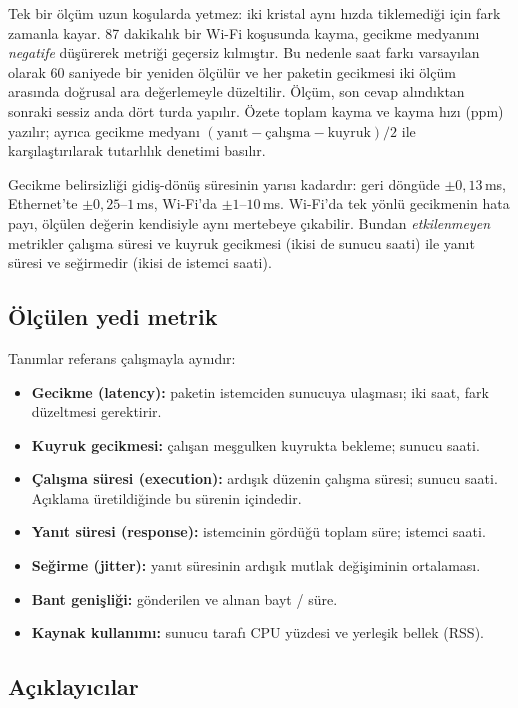 \documentclass[conference]{IEEEtran}
\newcommand{\ms}{\,ms\xspace}
\begin{document}
Tek bir ölçüm uzun koşularda yetmez: iki kristal aynı hızda tiklemediği için
fark zamanla kayar. 87 dakikalık bir Wi-Fi koşusunda kayma, gecikme medyanını
\emph{negatife} düşürerek metriği geçersiz kılmıştır. Bu nedenle saat farkı
varsayılan olarak 60 saniyede bir yeniden ölçülür ve her paketin gecikmesi iki
ölçüm arasında doğrusal ara değerlemeyle düzeltilir. Ölçüm, son cevap alındıktan
sonraki sessiz anda dört turda yapılır. Özete toplam kayma ve kayma hızı (ppm)
yazılır; ayrıca gecikme medyanı
$(\text{yanıt} - \text{çalışma} - \text{kuyruk})/2$ ile karşılaştırılarak
tutarlılık denetimi basılır.

Gecikme belirsizliği gidiş-dönüş süresinin yarısı kadardır:
geri döngüde $\pm0{,}13$\ms, Ethernet'te $\pm0{,}25$--$1$\ms, Wi-Fi'da
$\pm1$--$10$\ms. Wi-Fi'da tek yönlü gecikmenin hata payı, ölçülen değerin
kendisiyle aynı mertebeye çıkabilir. Bundan \emph{etkilenmeyen} metrikler
çalışma süresi ve kuyruk gecikmesi (ikisi de sunucu saati) ile yanıt süresi ve
seğirmedir (ikisi de istemci saati).

\subsection{Ölçülen yedi metrik}

Tanımlar referans çalışmayla \cite{erzurumluoglu2025} aynıdır:

\begin{itemize}
\item \textbf{Gecikme (latency):} paketin istemciden sunucuya ulaşması; iki saat,
fark düzeltmesi gerektirir.
\item \textbf{Kuyruk gecikmesi:} çalışan meşgulken kuyrukta bekleme; sunucu saati.
\item \textbf{Çalışma süresi (execution):} ardışık düzenin çalışma süresi; sunucu
saati. Açıklama üretildiğinde bu sürenin içindedir.
\item \textbf{Yanıt süresi (response):} istemcinin gördüğü toplam süre; istemci
saati.
\item \textbf{Seğirme (jitter):} yanıt süresinin ardışık mutlak değişiminin
ortalaması.
\item \textbf{Bant genişliği:} gönderilen ve alınan bayt / süre.
\item \textbf{Kaynak kullanımı:} sunucu tarafı CPU yüzdesi ve yerleşik bellek
(RSS).
\end{itemize}

\subsection{Açıklayıcılar}
\end{document}
